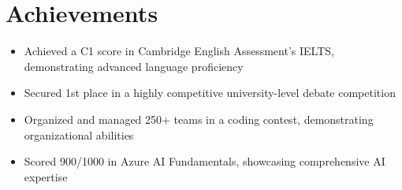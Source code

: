 \documentclass[a4paper,11pt]{article}
\begin{document}
\section{\textbf{{\LARGE Achievements}}}
\begin{itemize}[label={$\bullet$}, leftmargin=*]
\item Achieved a C1 score in Cambridge English Assessment's IELTS, demonstrating advanced language proficiency
\item Secured 1st place in a highly competitive university-level debate competition
\item Organized and managed 250+ teams in a coding contest, demonstrating organizational abilities
\item Scored 900/1000 in Azure AI Fundamentals, showcasing comprehensive AI expertise
\end{itemize}
\end{document}
